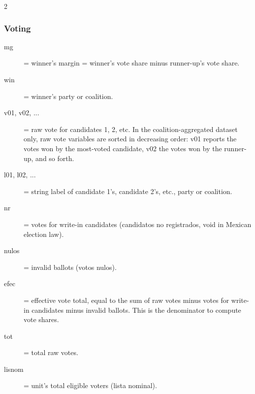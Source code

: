 \documentclass[letter,12pt]{article}
\begin{document}
\begin{singlespace}
\begin{multicols}{2}
\begin{footnotesize}
\subsubsection{Voting}
\begin{description}
\item[mg] = winner's margin = winner's vote share minus runner-up's vote share.
\item[win] = winner's party or coalition.
\item[v01, v02, ...] = raw vote for candidates 1, 2, etc. In the coalition-aggregated dataset only, raw vote variables are sorted in decreasing order: v01 reports the votes won by the most-voted candidate, v02 the votes won by the runner-up, and so forth.
\item[l01, l02, ...] = string label of candidate 1's, candidate 2's, etc., party or coalition.
\item[nr] = votes for write-in candidates (candidatos no registrados, void in Mexican election law).
\item[nulos] = invalid ballots (votos nulos).
\item[efec] = effective vote total, equal to the sum of raw votes minus votes for write-in candidates minus invalid ballots. This is the denominator to compute vote shares.
\item[tot] = total raw votes.
\item[lisnom] = unit's total eligible voters (lista nominal).
\end{description}

\end{footnotesize}
\end{multicols}
\end{singlespace}
\end{document}

